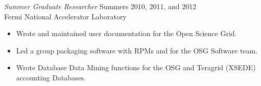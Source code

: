 \documentclass[margin]{res}
\begin{document}
\begin{resume}
               {\sl Summer Graduate Researcher} \hfill        Summers 2010, 2011, and 2012 \\
               Fermi National Accelerator Laboratory \hfill   
               \begin{itemize}  \itemsep -2pt
               	\item Wrote and maintained user documentation for the Open Science Grid.
               	\item Led a group packaging software with RPMs and for the OSG Software team.
               	\item Wrote Database Data Mining functions for the OSG and Teragrid (XSEDE) accounting Databases.
               \end{itemize} 
               


% 


\end{resume}
\end{document}
